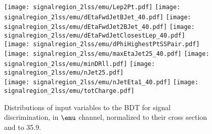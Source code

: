 \begin{figure} [!h]
  \centering
  \texttt{[image: signalregion\_2lss/emu/Lep2Pt.pdf]}
  \texttt{[image: signalregion\_2lss/emu/dEtaFwdJetBJet\_40.pdf]}
  \texttt{[image: signalregion\_2lss/emu/dEtaFwdJet2BJet\_40.pdf]}
  \texttt{[image: signalregion\_2lss/emu/dEtaFwdJetClosestLep\_40.pdf]} \\
  \texttt{[image: signalregion\_2lss/emu/dPhiHighestPtSSPair.pdf]}
  \texttt{[image: signalregion\_2lss/emu/maxEtaJet25\_40.pdf]}
  \texttt{[image: signalregion\_2lss/emu/minDRll.pdf]}
  \texttt{[image: signalregion\_2lss/emu/nJet25.pdf]} \\
  \texttt{[image: signalregion\_2lss/emu/nJetEta1\_40.pdf]}
  \texttt{[image: signalregion\_2lss/emu/totCharge.pdf]}
  \caption{Distributions of input variables to the BDT for signal discrimination, in $\emu$ channel, normalized to their cross section and to 35.9\fbinv.}
  \label{fig:input_vars_2lss_xsec_emu}
\end{figure}

